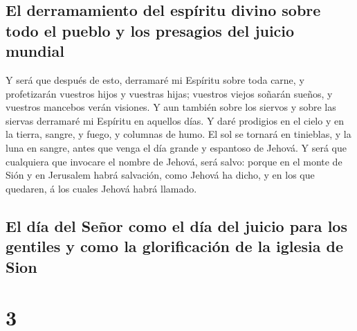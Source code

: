 \hypertarget{el-derramamiento-del-espuxedritu-divino-sobre-todo-el-pueblo-y-los-presagios-del-juicio-mundial}{%
\subsection{El derramamiento del espíritu divino sobre todo el pueblo y
los presagios del juicio
mundial}\label{el-derramamiento-del-espuxedritu-divino-sobre-todo-el-pueblo-y-los-presagios-del-juicio-mundial}}

 Y será que después de esto, derramaré mi Espíritu sobre
toda carne, y profetizarán vuestros hijos y vuestras hijas; vuestros
viejos soñarán sueños, y vuestros mancebos verán visiones. 
Y aun también sobre los siervos y sobre las siervas derramaré mi
Espíritu en aquellos días.  Y daré prodigios en el cielo y
en la tierra, sangre, y fuego, y columnas de humo.  El sol
se tornará en tinieblas, y la luna en sangre, antes que venga el día
grande y espantoso de Jehová.  Y será que cualquiera que
invocare el nombre de Jehová, será salvo: porque en el monte de Sión y
en Jerusalem habrá salvación, como Jehová ha dicho, y en los que
quedaren, á los cuales Jehová habrá llamado.

\hypertarget{el-duxeda-del-seuxf1or-como-el-duxeda-del-juicio-para-los-gentiles-y-como-la-glorificaciuxf3n-de-la-iglesia-de-sion}{%
\subsection{El día del Señor como el día del juicio para los gentiles y
como la glorificación de la iglesia de
Sion}\label{el-duxeda-del-seuxf1or-como-el-duxeda-del-juicio-para-los-gentiles-y-como-la-glorificaciuxf3n-de-la-iglesia-de-sion}}

\hypertarget{section-2}{%
\section{3}\label{section-2}}

